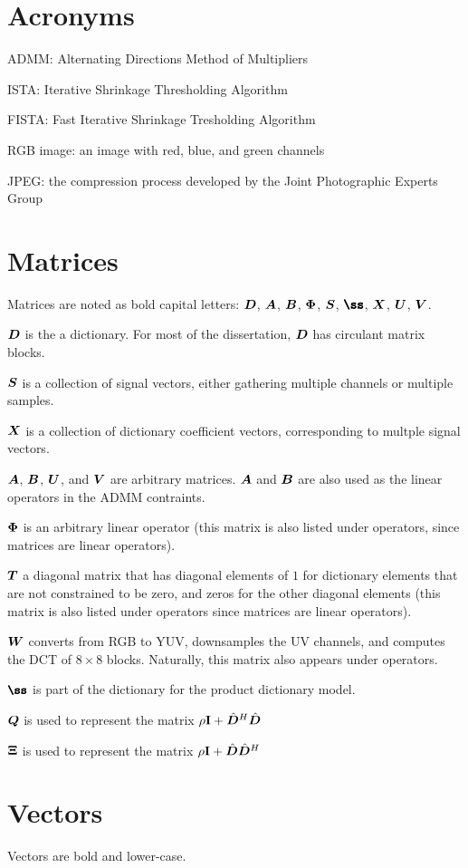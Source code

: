 \documentclass{article}
\begin{document}
\section{Acronyms}
ADMM: Alternating Directions Method of Multipliers

ISTA: Iterative Shrinkage Thresholding Algorithm

FISTA: Fast Iterative Shrinkage Tresholding Algorithm

RGB image: an image with red, blue, and green channels

JPEG: the compression process developed by the Joint Photographic Experts Group

\section{Matrices}
Matrices are noted as bold capital letters: $\bm{D}$, $\bm{A}$, $\bm{B}$, $\bm{\Phi}$, $\bm{S}$, $\mSS$, $\bm{X}$, $\bm{U}$, $\bm{V}$.

$\bm{D}$ is the a dictionary. For most of the dissertation, $\bm{D}$ has circulant matrix blocks.

$\bm{S}$ is a collection of signal vectors, either gathering multiple channels or multiple samples.

$\bm{X}$ is a collection of dictionary coefficient vectors, corresponding to multple signal vectors.

$\bm{A}$, $\bm{B}$, $\bm{U}$, and $\bm{V}$ are arbitrary matrices. $\bm{A}$ and $\bm{B}$ are also used as the linear operators in the ADMM contraints.

$\bm{\Phi}$ is an arbitrary linear operator (this matrix is also listed under operators, since matrices are linear operators).

$\bm{T}$ a diagonal matrix that has diagonal elements of $1$ for dictionary elements that are not constrained to be zero, and zeros for the other diagonal elements (this matrix is also listed under operators since matrices are linear operators).

$\bm{W}$ converts from RGB to YUV, downsamples the UV channels, and computes the DCT  of $8 \times 8$ blocks. Naturally, this matrix also appears under operators.

$\mSS$ is part of the dictionary for the product dictionary model.

$\bm{Q}$ is used to represent the matrix $\rho{\bf I} + \hat{\bm{D}}^H\hat{\bm{D}}$

$\bm{\Xi}$ is used to represent the matrix $\rho{\bf I} + \hat{\bm{D}}\hat{\bm{D}}^H$

\section{Vectors}
Vectors are bold and lower-case.
\end{document}
